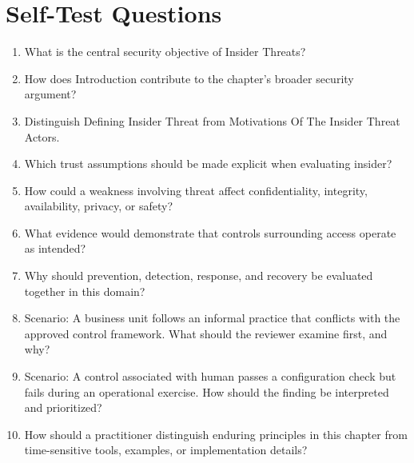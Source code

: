 \documentclass[11pt]{article}
\begin{document}
\section*{Self-Test Questions}
\begin{enumerate}
\item What is the central security objective of Insider Threats?
\item How does Introduction contribute to the chapter's broader security argument?
\item Distinguish Defining Insider Threat from Motivations Of The Insider Threat Actors.
\item Which trust assumptions should be made explicit when evaluating insider?
\item How could a weakness involving threat affect confidentiality, integrity, availability, privacy, or safety?
\item What evidence would demonstrate that controls surrounding access operate as intended?
\item Why should prevention, detection, response, and recovery be evaluated together in this domain?
\item Scenario: A business unit follows an informal practice that conflicts with the approved control framework. What should the reviewer examine first, and why?
\item Scenario: A control associated with human passes a configuration check but fails during an operational exercise. How should the finding be interpreted and prioritized?
\item How should a practitioner distinguish enduring principles in this chapter from time-sensitive tools, examples, or implementation details?
\end{enumerate}
\end{document}
